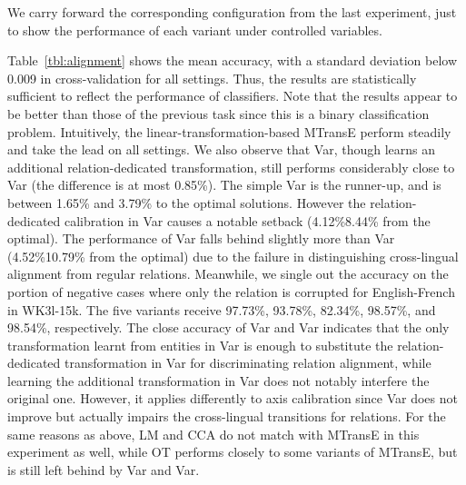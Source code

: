 \documentclass{article}
\def\inv{\vspace{-0.1cm}}
\begin{document}
We carry forward the corresponding configuration from the last experiment, just to show the performance of each variant under controlled variables.

 Table~\ref{tbl:alignment} shows the mean accuracy, with a \mbox{standard} deviation below 0.009 in cross-validation for all settings. Thus,
the results are statistically sufficient to reflect the performance of classifiers. Note that the results appear to be better than those of the previous task since this is a binary classification problem. Intuitively, the linear-transformation-based MTransE perform steadily and take the lead on all settings. We also observe that Var, though learns an additional relation-dedicated transformation, still performs considerably close to Var (the difference is at most 0.85\%). The simple Var is the runner-up, and is between 1.65\% and 3.79\% to the optimal solutions. However the relation-dedicated calibration in Var causes a notable setback (4.12\%8.44\% from the optimal). The performance of Var falls behind slightly more than Var (4.52\%10.79\% from the optimal) due to the failure in distinguishing cross-lingual alignment from regular relations. Meanwhile, we single out the accuracy on the portion of negative cases where only the relation is corrupted for English-French in WK3l-15k. The five variants receive 97.73\%, 93.78\%, 82.34\%, 98.57\%, and 98.54\%, respectively. The close accuracy of Var and Var indicates that the only transformation learnt from entities in Var is \mbox{enough} to substitute the relation-dedicated transformation in Var for discriminating relation \mbox{alignment}, while learning the additional transformation in Var does not notably interfere the original one. However, it applies differently to axis calibration since Var does not improve but actually impairs the cross-lingual transitions for relations. For the same reasons as above, LM and CCA do not match with MTransE in this experiment as well, while OT performs closely to some variants of MTransE, but is still left behind by Var and Var.
\par



\inv
\end{document}
